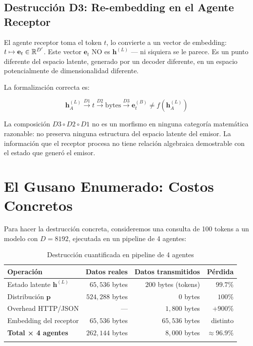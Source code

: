 \subsection{Destrucción D3: Re-embedding en el Agente Receptor}

El agente receptor toma el token $t$, lo convierte a un vector de embedding:
$t \mapsto \mathbf{e}_t \in \mathbb{R}^{D'}$. Este vector $\mathbf{e}_t$ NO es
$\mathbf{h}^{(L)}$ --- ni siquiera se le parece. Es un punto diferente del
espacio latente, generado por un decoder diferente, en un espacio potencialmente
de dimensionalidad diferente.

La formalización correcta es:

\begin{equation}
\mathbf{h}_A^{(L)} \xrightarrow{D1} t \xrightarrow{D2} \text{bytes} \xrightarrow{D3} \mathbf{e}_{t}^{(B)} \ne f(\mathbf{h}_A^{(L)})
\end{equation}

La composición $D3 \circ D2 \circ D1$ no es un morfismo en ninguna categoría
matemática razonable: no preserva ninguna estructura del espacio latente del
emisor. La información que el receptor procesa no tiene relación algebraica
demostrable con el estado que generó el emisor.

\section{El Gusano Enumerado: Costos Concretos}

Para hacer la destrucción concreta, consideremos una consulta de 100 tokens
a un modelo con $D = 8192$, ejecutada en un pipeline de 4 agentes:

\begin{longtable}{lrrr}
\toprule
\textbf{Operación} & \textbf{Datos reales} & \textbf{Datos transmitidos} & \textbf{Pérdida} \\
\midrule
Estado latente $\mathbf{h}^{(L)}$ & $65{,}536$ bytes & $200$ bytes (tokens) & $99.7\%$ \\
Distribución $\mathbf{p}$ & $524{,}288$ bytes & $0$ bytes & $100\%$ \\
Overhead HTTP/JSON & --- & $1{,}800$ bytes & $+900\%$ \\
Embedding del receptor & $65{,}536$ bytes & $65{,}536$ bytes & distinto \\
\midrule
\textbf{Total × 4 agentes} & $262{,}144$ bytes & $8{,}000$ bytes & $\approx 96.9\%$ \\
\bottomrule
\caption{Destrucción cuantificada en pipeline de 4 agentes}
\label{tab:destruccion}
\end{longtable}

